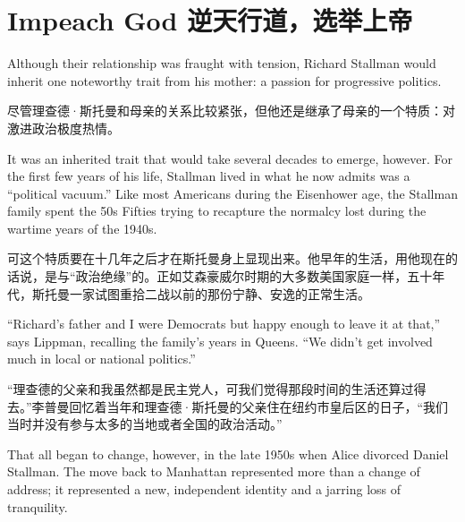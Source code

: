 
\chapter{\ifdefined\eng
Impeach God
\fi
\ifdefined\chs
逆天行道，选举上帝
\fi}

\ifdefined\eng
Although their relationship was fraught with tension, Richard Stallman would inherit one noteworthy trait from his mother: a passion for progressive politics.
\fi

\ifdefined\chs
尽管理查德·斯托曼和母亲的关系比较紧张，但他还是继承了母亲的一个特质：对激进政治极度热情。
\fi

\ifdefined\eng
It was an inherited trait that would take several decades to emerge, however. For the first few years of his life, Stallman lived in what he now admits was a ``political vacuum.'' Like most Americans during the Eisenhower age, the Stallman family spent the \ifdefined\vone 50s \fi\ifdefined\vtwo Fifties \fi trying to recapture the normalcy lost during the wartime years of the 1940s.
\fi

\ifdefined\chs
可这个特质要在十几年之后才在斯托曼身上显现出来。他早年的生活，用他现在的话说，是与``政治绝缘''的。正如艾森豪威尔时期的大多数美国家庭一样，五十年代，斯托曼一家试图重拾二战以前的那份宁静、安逸的正常生活。
\fi

\ifdefined\eng
``Richard's father and I were Democrats but happy enough to leave it at that,'' says Lippman, recalling the family's years in Queens. ``We didn't get involved much in local or national politics.''
\fi

\ifdefined\chs
``理查德的父亲和我虽然都是民主党人，可我们觉得那段时间的生活还算过得去。''李普曼回忆着当年和理查德·斯托曼的父亲住在纽约市皇后区的日子，``我们当时并没有参与太多的当地或者全国的政治活动。''
\fi

\ifdefined\eng
That all began to change, however, in the late 1950s when Alice divorced Daniel Stallman. The move back to Manhattan represented more than a change of address; it represented a new, independent identity and a jarring loss of tranquility.
\fi

